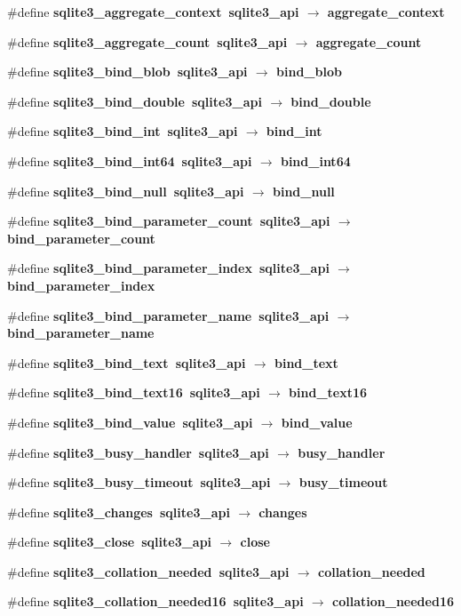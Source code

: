 \begin{CompactItemize}
\item 
\#define \bf{sqlite3\_\-aggregate\_\-context}~sqlite3\_\-api $\rightarrow$ aggregate\_\-context
\item 
\#define \bf{sqlite3\_\-aggregate\_\-count}~sqlite3\_\-api $\rightarrow$ aggregate\_\-count
\item 
\#define \bf{sqlite3\_\-bind\_\-blob}~sqlite3\_\-api $\rightarrow$ bind\_\-blob
\item 
\#define \bf{sqlite3\_\-bind\_\-double}~sqlite3\_\-api $\rightarrow$ bind\_\-double
\item 
\#define \bf{sqlite3\_\-bind\_\-int}~sqlite3\_\-api $\rightarrow$ bind\_\-int
\item 
\#define \bf{sqlite3\_\-bind\_\-int64}~sqlite3\_\-api $\rightarrow$ bind\_\-int64
\item 
\#define \bf{sqlite3\_\-bind\_\-null}~sqlite3\_\-api $\rightarrow$ bind\_\-null
\item 
\#define \bf{sqlite3\_\-bind\_\-parameter\_\-count}~sqlite3\_\-api $\rightarrow$ bind\_\-parameter\_\-count
\item 
\#define \bf{sqlite3\_\-bind\_\-parameter\_\-index}~sqlite3\_\-api $\rightarrow$ bind\_\-parameter\_\-index
\item 
\#define \bf{sqlite3\_\-bind\_\-parameter\_\-name}~sqlite3\_\-api $\rightarrow$ bind\_\-parameter\_\-name
\item 
\#define \bf{sqlite3\_\-bind\_\-text}~sqlite3\_\-api $\rightarrow$ bind\_\-text
\item 
\#define \bf{sqlite3\_\-bind\_\-text16}~sqlite3\_\-api $\rightarrow$ bind\_\-text16
\item 
\#define \bf{sqlite3\_\-bind\_\-value}~sqlite3\_\-api $\rightarrow$ bind\_\-value
\item 
\#define \bf{sqlite3\_\-busy\_\-handler}~sqlite3\_\-api $\rightarrow$ busy\_\-handler
\item 
\#define \bf{sqlite3\_\-busy\_\-timeout}~sqlite3\_\-api $\rightarrow$ busy\_\-timeout
\item 
\#define \bf{sqlite3\_\-changes}~sqlite3\_\-api $\rightarrow$ changes
\item 
\#define \bf{sqlite3\_\-close}~sqlite3\_\-api $\rightarrow$ close
\item 
\#define \bf{sqlite3\_\-collation\_\-needed}~sqlite3\_\-api $\rightarrow$ collation\_\-needed
\item 
\#define \bf{sqlite3\_\-collation\_\-needed16}~sqlite3\_\-api $\rightarrow$ collation\_\-needed16

\end{CompactItemize}
